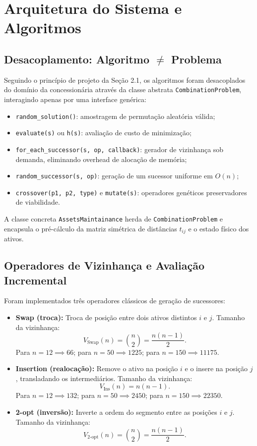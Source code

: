 \documentclass[11pt,a4paper]{article}
\begin{document}
\section{Arquitetura do Sistema e Algoritmos}

\subsection{Desacoplamento: Algoritmo $\neq$ Problema}
Seguindo o princípio de projeto da Seção 2.1, os algoritmos foram desacoplados do domínio da concessionária através da classe abstrata \texttt{CombinationProblem}, interagindo apenas por uma interface genérica:
\begin{itemize}
    \item \texttt{random\_solution()}: amostragem de permutação aleatória válida;
    \item \texttt{evaluate(s)} ou \texttt{h(s)}: avaliação de custo de minimização;
    \item \texttt{for\_each\_successor(s, op, callback)}: gerador de vizinhança sob demanda, eliminando overhead de alocação de memória;
    \item \texttt{random\_successor(s, op)}: geração de um sucessor uniforme em $O(n)$;
    \item \texttt{crossover(p1, p2, type)} e \texttt{mutate(s)}: operadores genéticos preservadores de viabilidade.
\end{itemize}

A classe concreta \texttt{AssetsMaintainance} herda de \texttt{CombinationProblem} e encapsula o pré-cálculo da matriz simétrica de distâncias $t_{ij}$ e o estado físico dos ativos.

\subsection{Operadores de Vizinhança e Avaliação Incremental}
Foram implementados três operadores clássicos de geração de sucessores:
\begin{itemize}
    \item \textbf{Swap (troca):} Troca de posição entre dois ativos distintos $i$ e $j$. Tamanho da vizinhança:
    \begin{equation}
        V_{\text{Swap}}(n) = \binom{n}{2} = \frac{n(n-1)}{2}.
    \end{equation}
    Para $n=12 \implies 66$; para $n=50 \implies 1225$; para $n=150 \implies 11175$.
    \item \textbf{Insertion (realocação):} Remove o ativo na posição $i$ e o insere na posição $j$, transladando os intermediários. Tamanho da vizinhança:
    \begin{equation}
        V_{\text{Ins}}(n) = n(n-1).
    \end{equation}
    Para $n=12 \implies 132$; para $n=50 \implies 2450$; para $n=150 \implies 22350$.
    \item \textbf{2-opt (inversão):} Inverte a ordem do segmento entre as posições $i$ e $j$. Tamanho da vizinhança:
    \begin{equation}
        V_{\text{2-opt}}(n) = \binom{n}{2} = \frac{n(n-1)}{2}.
    \end{equation}
\end{itemize}
\end{document}
